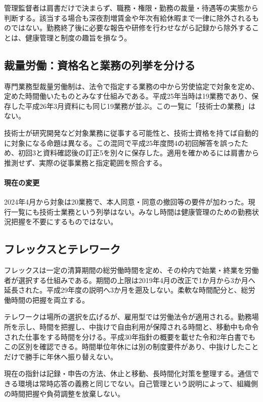 管理監督者は肩書だけで決まらず、職務・権限・勤務の裁量・待遇等の実態から判断する。該当する場合も深夜割増賃金や年次有給休暇まで一律に除外されるものではない\parencite{employment_manager2008}。勤務終了後に必要な報告や研修を行わせながら記録から除外することは、健康管理と制度の趣旨を損なう。

\subsection{裁量労働：資格名と業務の列挙を分ける}
\label{theory:employment:discretion}
専門業務型裁量労働制は、法令で指定する業務の中から労使協定で対象を定め、定めた時間働いたものとみなす仕組みである。平成25年当時は19業務であり、保存した平成26年3月資料にも同じ19業務が並ぶ。この一覧に「技術士の業務」はない\parencite{employment_discretion2014}。

技術士が研究開発など対象業務に従事する可能性と、技術士資格を持てば自動的に対象になる命題は異なる。この混同で平成25年度問4の初回解答を誤ったため、初回3と資料確認後の訂正5を別々に保存した。適用を確かめるには肩書から推測せず、実際の従事業務と指定範囲を照合する。

\paragraph{現在の変更}2024年4月から対象は20業務で、本人同意・同意の撤回等の要件が加わった。現行一覧にも技術士業務という列挙はない\parencite{employment_discretion_current}。みなし時間は健康管理のための勤務状況把握を不要にするものではない。

\subsection{フレックスとテレワーク}
\label{theory:employment:flex}
フレックスは一定の清算期間の総労働時間を定め、その枠内で始業・終業を労働者が選択する仕組みである。期間の上限は2019年4月の改正で1か月から3か月へ延長された\parencite{employment_reform2018}。平成29年度の説明へ3か月を遡及しない。柔軟な時間配分と、総労働時間の把握を両立する。

\label{theory:employment:telework}
テレワークは場所の選択を広げるが、雇用型では労働法令が適用される。勤務場所を示し、時間を把握し、中抜けで自由利用が保障される時間と、移動中も命令された仕事をする時間を分ける。平成30年指針の概要を載せた令和2年白書でもこの区別を確認できる\parencite{employment_telework2020}。時間単位年休には別の制度要件があり、中抜けしたことだけで勝手に年休へ振り替えない。

現在の指針は記録・申告の方法、休止と移動、長時間化対策を整理する\parencite{employment_telework_current}。通信できる環境は常時応答の義務と同じでない。自己管理という説明によって、組織側の時間把握や負荷調整を放棄しない。

